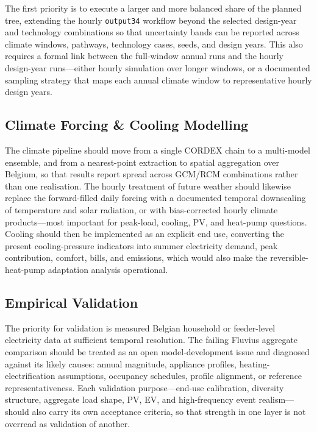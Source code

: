 The first priority is to execute a larger and more balanced share of the planned
tree, extending the hourly \texttt{output34} workflow beyond the selected
design-year and technology combinations so that uncertainty bands can be
reported across climate windows, pathways, technology cases, seeds, and design
years. This also requires a formal link between the full-window annual runs and
the hourly design-year runs---either hourly simulation over longer windows, or a
documented sampling strategy that maps each annual climate window to
representative hourly design years.


\subsection{Climate Forcing \& Cooling Modelling}
\label{sec:futureworkClimateCooling}

The climate pipeline should move from a single CORDEX chain to a multi-model
ensemble, and from a nearest-point extraction to spatial aggregation over
Belgium, so that results report spread across GCM/RCM combinations rather than
one realisation. The hourly treatment of future weather should likewise replace
the forward-filled daily forcing with a documented temporal downscaling of
temperature and solar radiation, or with bias-corrected hourly climate
products---most important for peak-load, cooling, PV, and heat-pump questions.
Cooling should then be implemented as an explicit end use, converting the
present cooling-pressure indicators into summer electricity demand, peak
contribution, comfort, bills, and emissions, which would also make the
reversible-heat-pump adaptation analysis operational.


\subsection{Empirical Validation}
\label{sec:futureworkValidation}

The priority for validation is measured Belgian household or feeder-level
electricity data at sufficient temporal resolution. The failing Fluvius
aggregate comparison should be treated as an open model-development issue and
diagnosed against its likely causes: annual magnitude, appliance profiles,
heating-electrification assumptions, occupancy schedules, profile alignment, or
reference representativeness. Each validation purpose---end-use calibration,
diversity structure, aggregate load shape, PV, EV, and high-frequency event
realism---should also carry its own acceptance criteria, so that strength in one
layer is not overread as validation of another.


